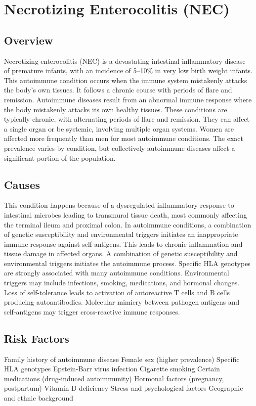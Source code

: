 \chapter{Necrotizing Enterocolitis (NEC)}
\label{sec:Necrotizing Enterocolitis}

\section{Overview}
Necrotizing enterocolitis (NEC) is a devastating intestinal inflammatory disease of premature infants, with an incidence of 5--10\% in very low birth weight infants. This autoimmune condition occurs when the immune system mistakenly attacks the body's own tissues. It follows a chronic course with periods of flare and remission. Autoimmune diseases result from an abnormal immune response where the body mistakenly attacks its own healthy tissues. These conditions are typically chronic, with alternating periods of flare and remission. They can affect a single organ or be systemic, involving multiple organ systems. Women are affected more frequently than men for most autoimmune conditions. The exact prevalence varies by condition, but collectively autoimmune diseases affect a significant portion of the population.
\section{Causes}
This condition happens because of a dysregulated inflammatory response to intestinal microbes leading to transmural tissue death, most commonly affecting the terminal ileum and proximal colon. In autoimmune conditions, a combination of genetic susceptibility and environmental triggers initiates an inappropriate immune response against self-antigens. This leads to chronic inflammation and tissue damage in affected organs. A combination of genetic susceptibility and environmental triggers initiates the autoimmune process. Specific HLA genotypes are strongly associated with many autoimmune conditions. Environmental triggers may include infections, smoking, medications, and hormonal changes. Loss of self-tolerance leads to activation of autoreactive T cells and B cells producing autoantibodies. Molecular mimicry between pathogen antigens and self-antigens may trigger cross-reactive immune responses.
\section{Risk Factors}
Family history of autoimmune disease Female sex (higher prevalence) Specific HLA genotypes Epstein-Barr virus infection Cigarette smoking Certain medications (drug-induced autoimmunity) Hormonal factors (pregnancy, postpartum) Vitamin D deficiency Stress and psychological factors Geographic and ethnic background

